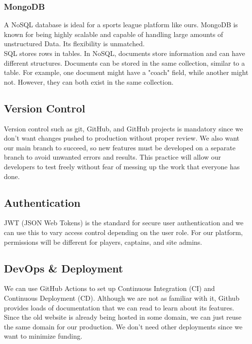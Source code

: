 \documentclass{article}
\begin{document}
\subsubsection*{MongoDB}

A NoSQL database is ideal for a sports league platform like ours. MongoDB is known for being highly scalable and capable of handling large amounts of unstructured Data. Its flexibility is unmatched. \\

\noindent SQL stores rows in tables. In NoSQL, documents store information and can have different structures. Documents can be stored in the same collection, similar to a table. For example, one document might have a "coach" field, while another might not. However, they can both exist in the same collection.

\subsection*{Version Control}

Version control such as git, GitHub, and GitHub projects is mandatory since we don't want changes pushed to production without proper review. We also want our main branch to succeed, so new features must be developed on a separate branch to avoid unwanted errors and results. This practice will allow our developers to test freely without fear of messing up the work that everyone has done.

\subsection*{Authentication}

JWT (JSON Web Tokens) is the standard for secure user authentication and we can use this to vary access control depending on the user role. For our platform, permissions will be different for players, captains, and site admins.

\subsection*{DevOps \& Deployment}

We can use GitHub Actions to set up Continuous Integration (CI) and Continuous Deployment (CD). Although we are not as familiar with it, Github provides loads of documentation that we can read to learn about its features.\\

\noindent Since the old website is already being hosted in some domain, we can just reuse the same domain for our production. We don't need other deployments since we want to minimize funding.
\end{document}
